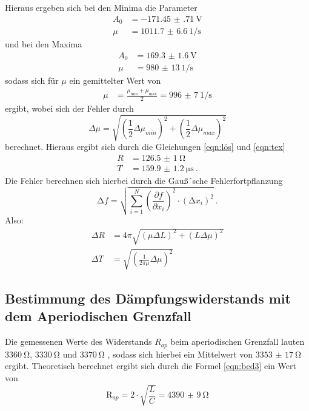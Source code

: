 \noindent Hieraus ergeben sich bei den Minima die Parameter
\begin{align*}
  A_0 &= \SI{-171.45(71)}{\volt} \\
  \mu&= \SI{1011.7(66)}{1\per\second}
\end{align*}
und bei den Maxima
\begin{align*}
  A_0 &= \SI{169.3(16)}{\volt} \\
  \mu&= \SI{980(13)}{1\per\second}
\end{align*}
sodass sich für $ \mu $ ein gemittelter Wert von
\begin{align*}
  \mu &= \frac{\mu_{\text{min}}+\mu_{\text{max}}}{2} = \SI{996(7)}{1\per\second}
\end{align*}
ergibt, wobei sich der Fehler durch
\begin{equation}
  \Delta \mu = \sqrt{(\frac{1}{2}\Delta \mu_{min})^2 + (\frac{1}{2}\Delta \mu_{max})^2}
\end{equation}
berechnet.
Hieraus ergibt sich durch die Gleichungen \ref{eqn:lös} und \ref{eqn:tex}
\begin{align*}
  R&= \SI{126.5(10)}{\ohm} \\
  T&= \SI{159.9(12)}{\micro\second} \: .
\end{align*}
Die Fehler berechnen sich hierbei durch die Gauß´sche Fehlerfortpflanzung
\begin{equation}
  \increment f = \sqrt{ \sum_{i=1}^N \left( \frac{\partial f}{\partial x_i}\right)^2
  \cdot (\increment x_i)^2  } \: .
  \label{eqn:gaus}
\end{equation}
Also:
\begin{align}
  \Delta R &=4 \pi \sqrt{(\mu \Delta L )^2 +(L \Delta \mu )^2} \\
  \Delta T &= \sqrt{\left(\frac{1}{2\pi\mu} \Delta \mu \right)^2}
\end{align}
\subsection{Bestimmung des Dämpfungswiderstands mit dem Aperiodischen Grenzfall}

Die gemessenen Werte des Widerstands $R_{ap}$ beim aperiodischen Grenzfall lauten
$\SI{3360}{\ohm}$, $\SI{3330}{\ohm}$ und $\SI{3370}{\ohm}$ , sodass sich hierbei ein Mittelwert
von $\SI{3353(17)}{\ohm}$ ergibt.
\noindent Theoretisch berechnet ergibt sich durch die Formel \ref{eqn:bed3}
ein Wert von
\begin{equation*}
  \text{R}_{ap}= 2 \cdot \sqrt{\frac{L}{C}} = \SI{4390(9)}{\ohm}
\end{equation*}



